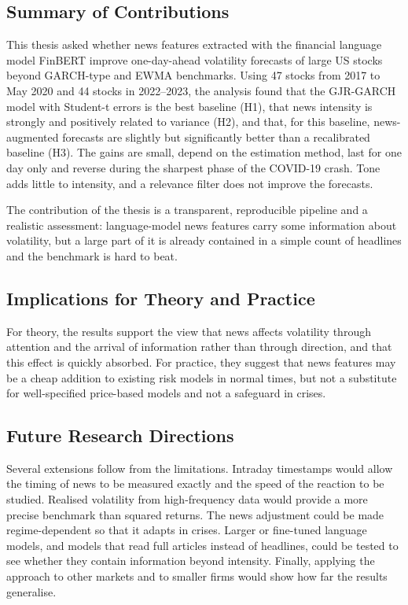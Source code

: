 \documentclass[12pt,a4paper]{article}
\begin{document}
\subsection{Summary of Contributions}\label{sec:conclusion-summary}
This thesis asked whether news features extracted with the financial language model FinBERT improve one-day-ahead volatility forecasts of large US stocks beyond GARCH-type and EWMA benchmarks. Using 47 stocks from 2017 to May 2020 and 44 stocks in 2022--2023, the analysis found that the GJR-GARCH model with Student-t errors is the best baseline (H1), that news intensity is strongly and positively related to variance (H2), and that, for this baseline, news-augmented forecasts are slightly but significantly better than a recalibrated baseline (H3). The gains are small, depend on the estimation method, last for one day only and reverse during the sharpest phase of the COVID-19 crash. Tone adds little to intensity, and a relevance filter does not improve the forecasts.

The contribution of the thesis is a transparent, reproducible pipeline and a realistic assessment: language-model news features carry some information about volatility, but a large part of it is already contained in a simple count of headlines and the benchmark is hard to beat.

\subsection{Implications for Theory and Practice}\label{sec:conclusion-implications}
For theory, the results support the view that news affects volatility through attention and the arrival of information rather than through direction, and that this effect is quickly absorbed. For practice, they suggest that news features may be a cheap addition to existing risk models in normal times, but not a substitute for well-specified price-based models and not a safeguard in crises.

\subsection{Future Research Directions}\label{sec:conclusion-future}
Several extensions follow from the limitations. Intraday timestamps would allow the timing of news to be measured exactly and the speed of the reaction to be studied. Realised volatility from high-frequency data would provide a more precise benchmark than squared returns. The news adjustment could be made regime-dependent so that it adapts in crises. Larger or fine-tuned language models, and models that read full articles instead of headlines, could be tested to see whether they contain information beyond intensity. Finally, applying the approach to other markets and to smaller firms would show how far the results generalise.
\end{document}
